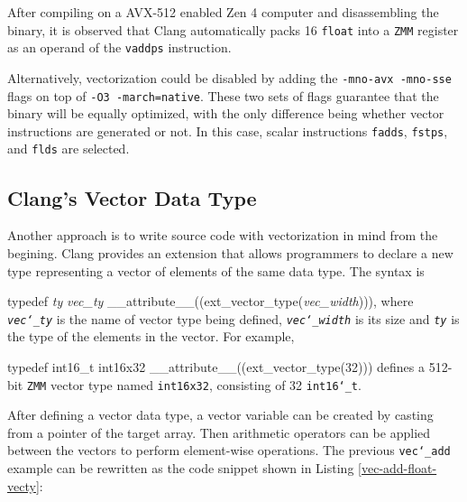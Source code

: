 \documentclass[logo,bsc,singlespacing,parskip]{infthesis}
\newcommand{\dtfloat}{\texttt{float}}
\newcommand{\zmm}{\texttt{ZMM}}
\newenvironment{VerbatimCompact}
  {\vspace*{-2.5mm}\VerbatimEnvironment
   \par\Verbatim}
  {\endVerbatim\vspace*{-2.4mm}}
\begin{document}
After compiling on a AVX-512 enabled Zen 4 computer and disassembling the
binary, it is observed that Clang automatically packs 16 \dtfloat{} into a \zmm{}
register as an operand of the \texttt{vaddps} instruction. 

Alternatively, vectorization could be disabled by adding the \texttt{-mno-avx
-mno-sse} flags on top of \texttt{-O3 -march=native}. These two sets of flags
guarantee that the binary will be equally optimized, with the only difference being whether vector instructions are generated or not. In this case, 
scalar instructions \texttt{fadds}, \texttt{fstps}, and \texttt{flds} are
selected.


\subsection{Clang's Vector Data Type}

Another approach is to write source code with vectorization in mind from the begining.
Clang provides an extension that allows programmers to declare a new type
representing a vector of elements of the same data type. The syntax is 
\begin{VerbatimCompact}[commandchars=\\\{\}]
typedef \textit{ty} \textit{vec_ty} __attribute__((ext_vector_type(\textit{vec_width}))), 
\end{VerbatimCompact}
where \textit{\texttt{vec\char`_ty}} is the name of vector type being defined,
\textit{\texttt{vec\char`_width}} is its size and \textit{\texttt{ty}} is the
type of the elements in the vector. For example, 
\begin{VerbatimCompact}[commandchars=\\\{\}]
typedef int16_t int16x32 __attribute__((ext_vector_type(32)))
\end{VerbatimCompact}
defines a 512-bit \zmm{} vector type named \texttt{int16x32}, consisting of 32
\texttt{int16\char`_t}. 

After defining a vector data type, a vector variable can be created by casting
from a pointer of the target array. Then arithmetic operators can be applied
between the vectors to perform element-wise operations. The previous
\texttt{vec\char`_add} example can be rewritten as the code snippet shown in Listing
\ref{vec-add-float-vecty}:
\end{document}
